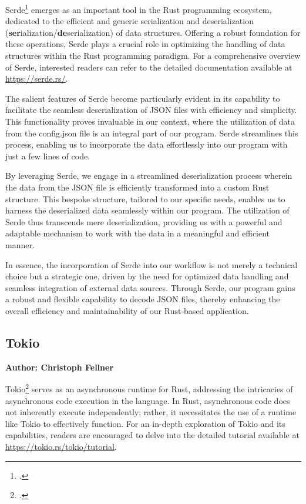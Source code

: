Serde\footcite{serde} emerges as an important tool in the Rust programming ecosystem, dedicated to the efficient and generic serialization and deserialization 
(\textbf{ser}ialization/\textbf{de}serialization) of data structures. Offering a robust foundation for these operations, Serde plays a crucial role in optimizing
the handling of data structures within the Rust programming paradigm. For a comprehensive overview of Serde, interested readers can refer to the detailed 
documentation available at \href{https://serde.rs/}{https://serde.rs/}.\newline

The salient features of Serde become particularly evident in its capability to facilitate the seamless deserialization of JSON files with efficiency and 
simplicity. This functionality proves invaluable in our context, where the utilization of data from the config.json file is an integral part of our program. 
Serde streamlines this process, enabling us to incorporate the data effortlessly into our program with just a few lines of code.\newline

By leveraging Serde, we engage in a streamlined deserialization process wherein the data from the JSON file is efficiently transformed into a custom Rust 
structure. This bespoke structure, tailored to our specific needs, enables us to harness the deserialized data seamlessly within our program. The utilization of
Serde thus transcends mere deserialization, providing us with a powerful and adaptable mechanism to work with the data in a meaningful and efficient manner.\newline

In essence, the incorporation of Serde into our workflow is not merely a technical choice but a strategic one, driven by the need for optimized data handling 
and seamless integration of external data sources. Through Serde, our program gains a robust and flexible capability to decode JSON files, thereby enhancing the
overall efficiency and maintainability of our Rust-based application.

\subsection{Tokio}
\textbf{Author: Christoph Fellner}

Tokio\footcite{tokio} serves as an asynchronous runtime for Rust, addressing the intricacies of asynchronous code execution in the language. In Rust, 
asynchronous code does not inherently execute independently; rather, it necessitates the use of a runtime like Tokio to effectively function. For an in-depth 
exploration of Tokio and its capabilities, readers are encouraged to delve into the detailed tutorial available at 
\href{https://tokio.rs/tokio/tutorial}{https://tokio.rs/tokio/tutorial}.\newline


